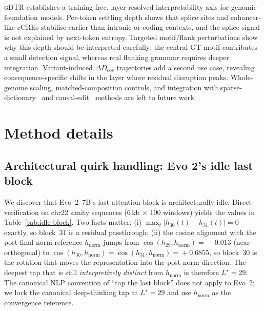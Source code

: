 \documentclass{article}
\theoremstyle{plain}
\theoremstyle{definition}
\theoremstyle{remark}
\newcommand{\gDTR}{\textsc{gDTR}}
\newcommand{\hnorm}{h_{\mathrm{norm}}}
\newcommand{\DDcos}{\Delta D_{\cos}}
\begin{document}
\gDTR{} establishes a training-free, layer-resolved interpretability axis for genomic foundation models. Per-token settling depth shows that splice sites and enhancer-like cCREs stabilise earlier than intronic or coding contexts, and the splice signal is not explained by next-token entropy. Targeted motif/flank perturbations show why this depth should be interpreted carefully: the central GT motif contributes a small detection signal, whereas real flanking grammar requires deeper integration. Variant-induced $\DDcos$ trajectories add a second use case, revealing consequence-specific shifts in the layer where residual disruption peaks. Whole-genome scaling, matched-composition controls, and integration with sparse-dictionary~\cite{cunningham2023sparse} and causal-edit~\cite{meng2022rome} methods are left to future work.





\newpage
\appendix
\onecolumn

\section{Method details}
\label{app:method}

\subsection{Architectural quirk handling: Evo 2's idle last block}
\label{app:architectural-quirk}

We discover that Evo~2~7B's last attention block is architecturally
idle. Direct verification on chr22 sanity sequences (6\,kb $\times$ 100
windows) yields the values in Table~\ref{tab:idle-block}. Two facts
matter: (i) $\max_t |h_{30}(t)\!-\!h_{31}(t)|\!=\!0$ exactly, so block~31
is a residual passthrough; (ii) the cosine alignment with the
post-final-norm reference $\hnorm$ jumps from $\cos(h_{29},\hnorm)\!=\!{-}0.013$
(near-orthogonal) to $\cos(h_{30},\hnorm)\!=\!\cos(h_{31},\hnorm)\!=\!{+}0.6855$,
so block~30 is the rotation that moves the representation into the
post-norm direction. The deepest tap that is still \emph{interpretively
distinct} from $\hnorm$ is therefore $L^{\star}=29$. The canonical NLP
convention of ``tap the last block'' does not apply to Evo~2; we lock
the canonical deep-thinking tap at $L^{\star}=29$ and use $\hnorm$ as
the convergence reference.
\end{document}
